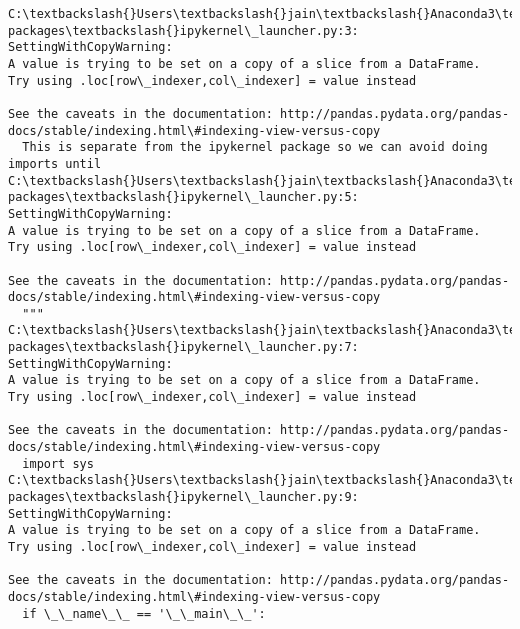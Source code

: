 \documentclass[11pt]{article}
\begin{document}
    \begin{Verbatim}[commandchars=\\\{\}]
C:\textbackslash{}Users\textbackslash{}jain\textbackslash{}Anaconda3\textbackslash{}lib\textbackslash{}site-packages\textbackslash{}ipykernel\_launcher.py:3: SettingWithCopyWarning: 
A value is trying to be set on a copy of a slice from a DataFrame.
Try using .loc[row\_indexer,col\_indexer] = value instead

See the caveats in the documentation: http://pandas.pydata.org/pandas-docs/stable/indexing.html\#indexing-view-versus-copy
  This is separate from the ipykernel package so we can avoid doing imports until
C:\textbackslash{}Users\textbackslash{}jain\textbackslash{}Anaconda3\textbackslash{}lib\textbackslash{}site-packages\textbackslash{}ipykernel\_launcher.py:5: SettingWithCopyWarning: 
A value is trying to be set on a copy of a slice from a DataFrame.
Try using .loc[row\_indexer,col\_indexer] = value instead

See the caveats in the documentation: http://pandas.pydata.org/pandas-docs/stable/indexing.html\#indexing-view-versus-copy
  """
C:\textbackslash{}Users\textbackslash{}jain\textbackslash{}Anaconda3\textbackslash{}lib\textbackslash{}site-packages\textbackslash{}ipykernel\_launcher.py:7: SettingWithCopyWarning: 
A value is trying to be set on a copy of a slice from a DataFrame.
Try using .loc[row\_indexer,col\_indexer] = value instead

See the caveats in the documentation: http://pandas.pydata.org/pandas-docs/stable/indexing.html\#indexing-view-versus-copy
  import sys
C:\textbackslash{}Users\textbackslash{}jain\textbackslash{}Anaconda3\textbackslash{}lib\textbackslash{}site-packages\textbackslash{}ipykernel\_launcher.py:9: SettingWithCopyWarning: 
A value is trying to be set on a copy of a slice from a DataFrame.
Try using .loc[row\_indexer,col\_indexer] = value instead

See the caveats in the documentation: http://pandas.pydata.org/pandas-docs/stable/indexing.html\#indexing-view-versus-copy
  if \_\_name\_\_ == '\_\_main\_\_':

    \end{Verbatim}

    \begin{center}
    \end{center}
    { \hspace*{\fill} \\}
    
\end{document}
